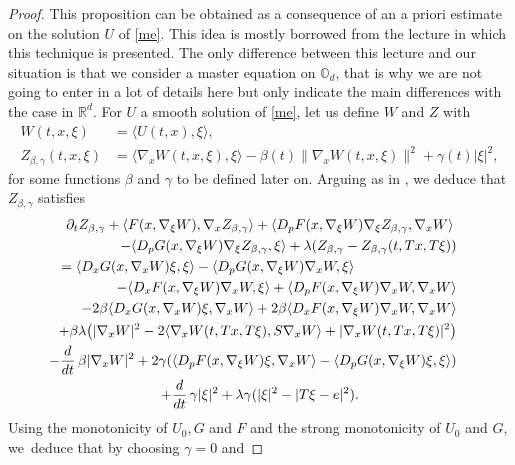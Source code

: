 \documentclass[10pt]{amsart}
\theoremstyle{definition}
\begin{document}
\begin{proof}
This proposition can be obtained as a consequence of an a priori estimate on the solution $U$ of \eqref{me}. This idea is mostly borrowed from the lecture \cite{lions2007cours} in which this technique is presented. The only difference between this lecture and our situation is that we consider a master equation on $\mathbb{O}_d$, that is why we are not going to enter in a lot of details here but only indicate the main differences with the case in $\mathbb{R}^d$. For $U$ a smooth solution of \eqref{me}, let us define $W$ and $Z$ with
\begin{align*}
W(t,x,\xi) &= \langle U(t,x), \xi \rangle,\\
Z_{\beta,\gamma}(t,x,\xi) &= \langle \nabla_x W(t,x,\xi), \xi \rangle-\beta(t) \|\nabla_x W(t,x,\xi)\|^2+\gamma(t) |\xi|^2,
\end{align*}
for some functions $\beta$ and $\gamma$ to be defined later on. Arguing as in \cite{lions2007cours}, we deduce that $Z_{\beta,\gamma}$ satisfies
\begin{multline}\label{Zedp}
 \partial_t Z_{\beta, \gamma}+\langle F(x,\nabla_{\xi} W), \nabla_x Z_{\beta, \gamma}\rangle+\langle D_p F (x,\nabla_{\xi} W) \nabla_{\xi}Z_{\beta, \gamma} , \nabla_{x} W\rangle\\
 \shoveright{-\langle D_p G(x, \nabla_{\xi}W)\nabla_{\xi}Z_{\beta, \gamma}, \xi\rangle 
+ \lambda(Z_{\beta, \gamma}-Z_{\beta, \gamma}(t,Tx, T\xi))}\\
 \shoveleft{= \langle D_xG(x, \nabla_x W) \xi, \xi\rangle-\langle D_pG(x, \nabla_{\xi}W) \nabla_x W, \xi\rangle}\\
 \shoveright{-\langle D_x F(x, \nabla_{\xi} W) \nabla_x W, \xi\rangle
+ \langle D_p F(x, \nabla_{\xi}W) \nabla_x W, \nabla_x W\rangle}\\
\shoveright{- 2 \beta \langle D_x G(x, \nabla_x W)\xi, \nabla_x W\rangle+2 \beta \langle D_x F(x, \nabla_{\xi} W) \nabla_x W, \nabla_x W\rangle}\\
\shoveright{+\beta \lambda \bigl(|\nabla_x W|^2-2 \langle \nabla_x W(t, Tx, T \xi), S \nabla_x W\rangle+| \nabla_x W(t,Tx, T \xi)|^2 \bigr)} \\
\shoveright{- \frac{d}{dt}\, \beta |\nabla_x W|^2+2 \gamma(\langle D_p F (x,\nabla_{\xi} W) \xi , \nabla_{x} W\rangle-\langle D_p G(x, \nabla_{\xi}W)\xi, \xi\rangle)}\\
+\frac{d}{dt}\,\gamma |\xi|^2+\lambda \gamma (|\xi|^2-|T\xi-e|^2).
\end{multline}
Using the monotonicity of $U_0,G$ and $F$ and the strong monotonicity of $U_0$ and $G$, we~deduce that by choosing $\gamma = 0$ and

\end{proof}
\end{document}
